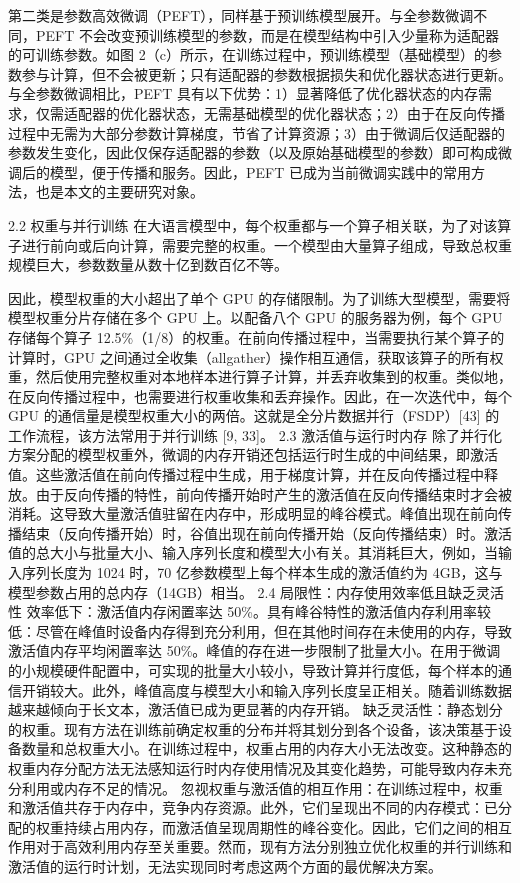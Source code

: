 第二类是参数高效微调（PEFT），同样基于预训练模型展开。与全参数微调不同，PEFT 不会改变预训练模型的参数，而是在模型结构中引入少量称为适配器的可训练参数。如图 2（c）所示，在训练过程中，预训练模型（基础模型）的参数参与计算，但不会被更新；只有适配器的参数根据损失和优化器状态进行更新。与全参数微调相比，PEFT 具有以下优势：1）显著降低了优化器状态的内存需求，仅需适配器的优化器状态，无需基础模型的优化器状态；2）由于在反向传播过程中无需为大部分参数计算梯度，节省了计算资源；3）由于微调后仅适配器的参数发生变化，因此仅保存适配器的参数（以及原始基础模型的参数）即可构成微调后的模型，便于传播和服务。因此，PEFT 已成为当前微调实践中的常用方法，也是本文的主要研究对象。

2.2 权重与并行训练
在大语言模型中，每个权重都与一个算子相关联，为了对该算子进行前向或后向计算，需要完整的权重。一个模型由大量算子组成，导致总权重规模巨大，参数数量从数十亿到数百亿不等。

因此，模型权重的大小超出了单个 GPU 的存储限制。为了训练大型模型，需要将模型权重分片存储在多个 GPU 上。以配备八个 GPU 的服务器为例，每个 GPU 存储每个算子 12.5\%（1/8）的权重。在前向传播过程中，当需要执行某个算子的计算时，GPU 之间通过全收集（allgather）操作相互通信，获取该算子的所有权重，然后使用完整权重对本地样本进行算子计算，并丢弃收集到的权重。类似地，在反向传播过程中，也需要进行权重收集和丢弃操作。因此，在一次迭代中，每个 GPU 的通信量是模型权重大小的两倍。这就是全分片数据并行（FSDP）[43] 的工作流程，该方法常用于并行训练 [9, 33]。
2.3 激活值与运行时内存
除了并行化方案分配的模型权重外，微调的内存开销还包括运行时生成的中间结果，即激活值。这些激活值在前向传播过程中生成，用于梯度计算，并在反向传播过程中释放。由于反向传播的特性，前向传播开始时产生的激活值在反向传播结束时才会被消耗。这导致大量激活值驻留在内存中，形成明显的峰谷模式。峰值出现在前向传播结束（反向传播开始）时，谷值出现在前向传播开始（反向传播结束）时。激活值的总大小与批量大小、输入序列长度和模型大小有关。其消耗巨大，例如，当输入序列长度为 1024 时，70 亿参数模型上每个样本生成的激活值约为 4GB，这与模型参数占用的总内存（14GB）相当。
2.4 局限性：内存使用效率低且缺乏灵活性
效率低下：激活值内存闲置率达 50\%。具有峰谷特性的激活值内存利用率较低：尽管在峰值时设备内存得到充分利用，但在其他时间存在未使用的内存，导致激活值内存平均闲置率达 50\%。峰值的存在进一步限制了批量大小。在用于微调的小规模硬件配置中，可实现的批量大小较小，导致计算并行度低，每个样本的通信开销较大。此外，峰值高度与模型大小和输入序列长度呈正相关。随着训练数据越来越倾向于长文本，激活值已成为更显著的内存开销。
缺乏灵活性：静态划分的权重。现有方法在训练前确定权重的分布并将其划分到各个设备，该决策基于设备数量和总权重大小。在训练过程中，权重占用的内存大小无法改变。这种静态的权重内存分配方法无法感知运行时内存使用情况及其变化趋势，可能导致内存未充分利用或内存不足的情况。
忽视权重与激活值的相互作用：在训练过程中，权重和激活值共存于内存中，竞争内存资源。此外，它们呈现出不同的内存模式：已分配的权重持续占用内存，而激活值呈现周期性的峰谷变化。因此，它们之间的相互作用对于高效利用内存至关重要。然而，现有方法分别独立优化权重的并行训练和激活值的运行时计划，无法实现同时考虑这两个方面的最优解决方案。


